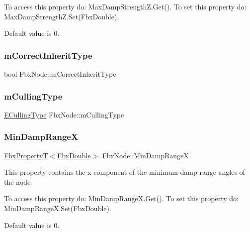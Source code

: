 To access this property do\+: Max\+Damp\+Strength\+Z.\+Get(). To set this property do\+: Max\+Damp\+Strength\+Z.\+Set(\+Fbx\+Double).

Default value is 0. \mbox{\label{class_fbx_node_acd21e92423faa682ac9270866e436924}} 
\subsubsection{\texorpdfstring{m\+Correct\+Inherit\+Type}{mCorrectInheritType}}
{\footnotesize\ttfamily bool Fbx\+Node\+::m\+Correct\+Inherit\+Type}

\mbox{\label{class_fbx_node_a897f88d6e23b1680d9452cd21b3d8add}} 
\subsubsection{\texorpdfstring{m\+Culling\+Type}{mCullingType}}
{\footnotesize\ttfamily \hyperlink{class_fbx_node_afdb6d2c1708802d8b175f5094ff06046}{E\+Culling\+Type} Fbx\+Node\+::m\+Culling\+Type}

\mbox{\label{class_fbx_node_a909da57f9cf8bb6e9e15c1d95b7919b6}} 
\subsubsection{\texorpdfstring{Min\+Damp\+RangeX}{MinDampRangeX}}
{\footnotesize\ttfamily \hyperlink{class_fbx_property_t}{Fbx\+PropertyT}$<$\hyperlink{fbxtypes_8h_a171e72a1c46fc15c1a6c9c31948c1c5b}{Fbx\+Double}$>$ Fbx\+Node\+::\+Min\+Damp\+RangeX}

This property contains the x component of the minimum damp range angles of the node

To access this property do\+: Min\+Damp\+Range\+X.\+Get(). To set this property do\+: Min\+Damp\+Range\+X.\+Set(\+Fbx\+Double).

Default value is 0. \mbox{\label{class_fbx_node_a27155ddcecae7a73a9fd249ccb9604f8}} 
